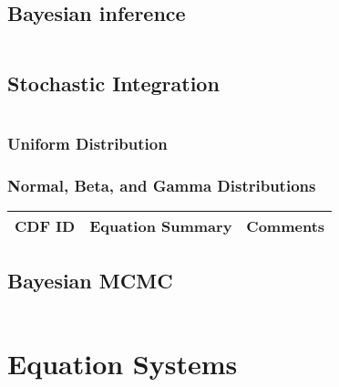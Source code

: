 \subsection{Bayesian inference}

\begin{equation}
\end{equation}

\subsection{Stochastic Integration}

\begin{equation}
\end{equation}

\subsubsection{Uniform Distribution}

\subsubsection{Normal, Beta, and Gamma Distributions}

\begin{table}[H]\centering
	\begin{tabular}{p{1cm}p{6cm}p{2cm}}
		CDF ID & Equation Summary & Comments\\
		\hline
		\hline
	\end{tabular}
\end{table}

\subsection{Bayesian MCMC}

\begin{equation}
\end{equation}

\section{Equation Systems}

